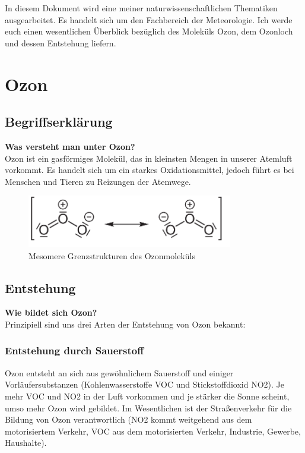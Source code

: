 \documentclass[11pt, a4paper]{article}
\begin{document}
In diesem Dokument wird eine meiner naturwissenschaftlichen Thematiken ausgearbeitet. Es handelt sich um den Fachbereich der Meteorologie. Ich werde euch einen wesentlichen Überblick bezüglich des Moleküls Ozon, dem Ozonloch und dessen Entstehung liefern.

\section{Ozon}

\subsection{Begriffserklärung}
\textbf{Was versteht man unter Ozon?}\\
Ozon ist ein gasförmiges Molekül, das in kleinsten Mengen in unserer Atemluft vorkommt. Es handelt sich um ein starkes Oxidationsmittel, jedoch führt es bei Menschen und Tieren zu Reizungen der Atemwege. \\

\begin{figure}[h!]
	\centering
	\includegraphics[width=0.8\textwidth]{images/ozon}
	\caption{Mesomere Grenzstrukturen des Ozonmoleküls}
\end{figure}

\subsection{Entstehung}
\textbf{Wie bildet sich Ozon?}\\
Prinzipiell sind uns drei Arten der Entstehung von Ozon bekannt:
\subsubsection{Entstehung durch Sauerstoff}
Ozon entsteht an sich aus gewöhnlichem Sauerstoff und einiger Vorläufersubstanzen (Kohlenwasserstoffe VOC und Stickstoffdioxid NO2). Je mehr VOC und NO2 in der Luft vorkommen und je stärker die Sonne scheint, umso mehr Ozon wird gebildet. Im Wesentlichen ist der Straßenverkehr für die Bildung von Ozon verantwortlich (NO2 kommt weitgehend aus dem motorisiertem Verkehr, VOC aus dem motorisierten Verkehr, Industrie, Gewerbe, Haushalte). 
\end{document}
